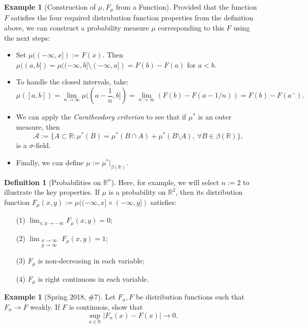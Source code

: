 \documentclass[12pt,reqno]{article}
\renewcommand{\emph}[1]{\textit{#1}}
\theoremstyle{plain}
\theoremstyle{definition}
\newtheorem{definition}[theorem]{Definition}
\newtheorem{example}[theorem]{Example}
\begin{document}
\begin{example}[Construction of $\mu,F_{\mu}$ from a Function]
Provided that the function $F$ satisfies the four required distrubution 
function properties from the definition above, we can construct a 
probability measure $\mu$ corresponding to this $F$ using the next steps:
\begin{itemize} 

\item Set $\mu((-\infty,x]) := F(x)$. Then 
$\mu((a,b]) = \mu((-\infty,b] \setminus (-\infty,a]) = F(b) - F(a)$ for 
$a < b$. 
\item To handle the closed intervals, take:
\[
\mu([a,b]) = \lim_{n \rightarrow \infty} \mu((a-\frac{1}{n},b]) = 
     \lim_{n \rightarrow \infty} (F(b) - F(a-1/n)) = F(b) - F(a^{-}). 
\]
\item We can apply the \emph{Caratheodory criterion} to see that if 
     $\mu^{\ast}$ is an outer measure, then 
     \[
     \mathcal{A} := \{A \subset \mathbb{R}: \mu^{\ast}(B) = 
     \mu^{\ast}(B \cap A) + \mu^{\ast}(B \setminus A),\ \forall 
     B \in \beta(\mathbb{R})\}, 
     \]
     is a $\sigma$-field. 
\item Finally, we can define 
     $\mu := \mu^{\ast} \Bigr\rvert_{\beta(\mathbb{R})}$. 

\end{itemize}
\end{example} 

\begin{definition}[Probabilities on $\mathbb{R}^n$]
Here, for example, we will select $n := 2$ to illustrate the key properties.
If $\mu$ is a probability on $\mathbb{R}^2$, then its distribution 
function $F_{\mu}(x, y) := \mu((-\infty,x] \times (-\infty,y])$ 
satisfies:
\begin{itemize}

\item[(1)] $\lim_{x,y \rightarrow -\infty} F_{\mu}(x, y) = 0$; 
\item[(2)] $\lim_{\substack{x \rightarrow \infty \\ y \rightarrow \infty}} 
     F_{\mu}(x, y) = 1$; 
\item[(3)] $F_{\mu}$ is non-decreasing in each variable; 
\item[(4)] $F_{\mu}$ is right continuous in each variable. 

\end{itemize} 
\end{definition} 

\begin{example}[Spring 2018, \#7]
Let $F_n,F$ be distribution functions such that $F_n \rightarrow F$ weakly. 
If $F$ is continuois, show that 
\[
\sup_{x \in \mathbb{R}} |F_n(x) - F(x)| \longrightarrow 0. 
\]
\end{example} 
\end{document}

